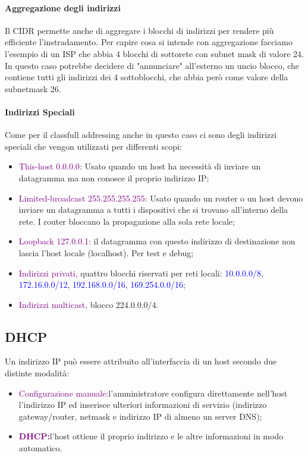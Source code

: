 \paragraph{Aggregazione degli indirizzi}
Il CIDR permette anche di aggregare i blocchi di indirizzi per rendere più efficiente l’instradamento. 
Per capire cosa si intende con aggregazione facciamo l'esempio di un ISP che abbia 4 blocchi di sottorete con subnet mask di valore 24.
In questo caso potrebbe decidere di "annunciare" all'esterno un uncio blocco, che contiene tutti gli indirizzi dei 4 sottoblocchi, che abbia però come valore della subnetmask 26.

\paragraph{Indirizzi Speciali}
Come per il classfull addressing anche in questo caso ci sono degli indirizzi speciali che vengon utilizzati per differenti scopi:
\begin{itemize}
    \item \textcolor{purple}{This-host 0.0.0.0:} Usato quando un host ha necessità di inviare un datagramma ma non conosce il proprio indirizzo IP;
    \item \textcolor{purple}{Limited-broadcast 255.255.255.255:} Usato quando un router o un host devono inviare un datagramma a tutti i dispositivi che si trovano all’interno della rete. 
    I router bloccano la propagazione alla sola rete locale;
    \item \textcolor{purple}{Loopback 127.0.0.1:} il datagramma con questo indirizzo di destinazione non lascia l’host locale (localhost). Per test e debug;
    \item \textcolor{purple}{Indirizzi privati,} quattro blocchi riservati per reti locali: \textcolor{blue}{10.0.0.0/8}, \textcolor{blue}{172.16.0.0/12}, \textcolor{blue}{192.168.0.0/16}, \textcolor{blue}{169.254.0.0/16};
    \item \textcolor{purple}{Indirizzi multicast,} blocco 224.0.0.0/4.
\end{itemize}

\subsection{DHCP}
Un indirizzo IP può essere attribuito all'interfaccia di un host secondo due distinte modalità:
\begin{itemize}
    \item \textcolor{purple}{Configurazione manuale:}l'amministratore configura direttamente nell'host l'indirizzo IP ed inserisce ulteriori informazioni di servizio (indirizzo gateway/router, netmask e indirizzo IP di almeno un server DNS);
    \item \textbf{\textcolor{purple}{DHCP:}}l'host ottiene il proprio indirizzo e le altre informazioni in modo automatico.
\end{itemize}

